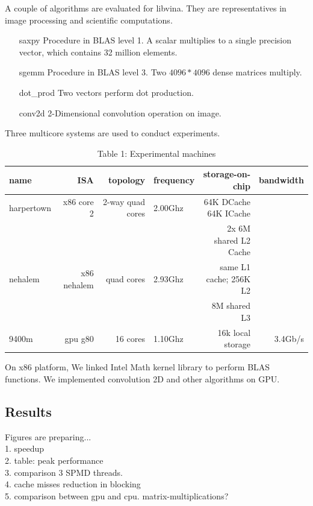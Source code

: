 \documentclass[10pt, conference, compsocconf]{IEEEtran}
\begin{document}
A couple of algorithms are evaluated for libvina.  They are representatives in image processing and scientific computations. 
\begin{itemize}
\item[saxpy] Procedure in BLAS level 1. A scalar multiplies to a single precision vector, which contains 32 million elements.
\item[sgemm] Procedure in BLAS level 3. Two $4096*4096$ dense matrices multiply.
\item[dot\_prod] Two vectors perform dot production.
\item[conv2d] 2-Dimensional convolution operation on image.
\end{itemize}

Three multicore systems are used to conduct experiments. 
\begin{table}[hb]
\caption{Table 1: Experimental machines}
\begin{center}
\begin{tabular}{|l|r|r|l|r|r|}
\hline
name       & ISA         & topology   & frequency  & storage-on-chip & bandwidth      \\
\hline 
harpertown & x86 core 2  & 2-way quad cores & 2.00Ghz & 64K DCache 64K ICache &         \\
           &             &                  &         & 2x 6M shared L2 Cache &         \\
\hline
nehalem    & x86 nehalem & quad cores       & 2.93Ghz & same L1 cache; 256K L2&         \\
           &             &                  &         & 8M shared L3          &         \\
\hline
9400m      & gpu g80     & 16 cores         & 1.10Ghz & 16k local storage     & 3.4Gb/s \\
\hline
\end{tabular} 
\end{center}
\end{table}
On x86 platform, We linked Intel Math kernel library to perform BLAS functions. We implemented convolution 2D and other algorithms on GPU. 

\subsection{Results}
Figures are preparing...\\
1. speedup\\
2. table: peak performance\\
3. comparison 3 SPMD threads.\\
4. cache misses reduction in blocking\\
5. comparison between gpu and cpu. matrix-multiplications?
\end{document}
